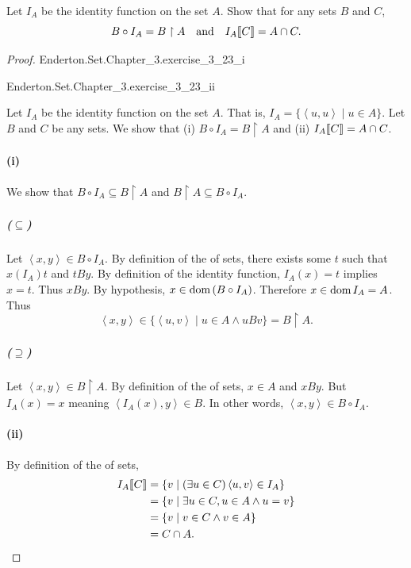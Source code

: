 \documentclass{report}
\newcommand{\pair}[1]{\left< #1 \right>}
\begin{document}
Let $I_A$ be the identity function on the set $A$.
Show that for any sets $B$ and $C$,
  $$B \circ I_A = B \restriction A \quad\text{and}\quad
    I_A\!\left\llbracket C\right\rrbracket = A \cap C.$$

\begin{proof}

  \statementpadding

    {Enderton.Set.Chapter\_3.exercise\_3\_23\_i}

    {Enderton.Set.Chapter\_3.exercise\_3\_23\_ii}

  Let $I_A$ be the identity function on the set $A$.
  That is, $I_A = \{\pair{u, u} \mid u \in A\}$.
  Let $B$ and $C$ be any sets.
  We show that (i) $B \circ I_A = B \restriction A$ and (ii)
    $I_A\!\left\llbracket C\right\rrbracket = A \cap C$.

  \paragraph{(i)}%

    We show that $B \circ I_A \subseteq B \restriction A$ and
      $B \restriction A \subseteq B \circ I_A$.

    \subparagraph{($\subseteq$)}%

      Let $\pair{x, y} \in B \circ I_A$.
      By definition of the  of sets,
        there exists some $t$ such that $x(I_A)t$ and $tBy$.
      By definition of the identity function, $I_A(x) = t$ implies $x = t$.
      Thus $xBy$.
      By hypothesis, $x \in \mathop{\text{dom}}{(B \circ I_A)}$.
      Therefore $x \in \mathop{\text{dom}}{I_A} = A$.
      Thus $$\pair{x, y} \in \{\pair{u, v} \mid u \in A \land uBv\}
        = B \restriction A.$$

    \subparagraph{($\supseteq$)}%

      Let $\pair{x, y} \in B \restriction A$.
      By definition of the  of sets,
        $x \in A$ and $xBy$.
      But $I_A(x) = x$ meaning $\pair{I_A(x), y} \in B$.
      In other words, $\pair{x, y} \in B \circ I_A$.

  \paragraph{(ii)}%

    By definition of the  of sets,
      \begin{align*}
        \img{I_A}{C}
          & = \{v \mid (\exists u \in C) \pair{u, v} \in I_A\} \\
          & = \{v \mid \exists u \in C, u \in A \land u = v\} \\
          & = \{v \mid v \in C \land v \in A\} \\
          & = C \cap A.
      \end{align*}

\end{proof}
\end{document}
